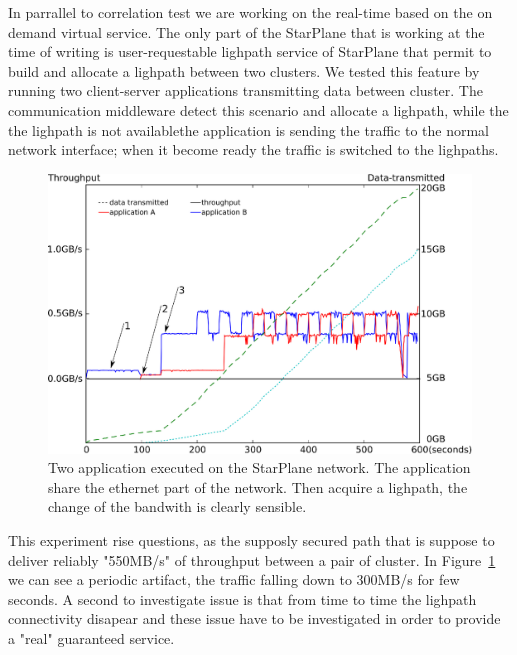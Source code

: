 In parrallel to correlation test we are working on the real-time based on 
the on demand virtual service. The only part of the StarPlane that is working at the time of writing is user-requestable lighpath service of StarPlane that permit to build and 
allocate a lighpath between two clusters. We tested this feature by running 
two client-server applications transmitting data between cluster. The communication middleware detect this scenario and allocate a lighpath, while the the lighpath is not availablethe application is sending the traffic to the normal network interface; when it become ready the traffic is switched to the lighpaths.  
\begin{figure}[h]
  \centering
  \includegraphics[width=\textwidth] {img/timing.eps}
    \caption{\label{fig:timing}
		Two application executed on the StarPlane network. The application share the ethernet part of the network. Then acquire a lighpath, the change of the bandwith is clearly sensible.}
\end{figure} 

This experiment rise questions, as the supposly secured path that is suppose to deliver reliably "550MB/s" of throughput between a pair of cluster. In Figure~\ref{fig:timing} we can see a periodic artifact, the traffic falling down to 300MB/s for few seconds. A second to investigate issue is that from time to time the lighpath connectivity disapear and these issue have to be investigated in order to provide a "real" guaranteed service. 
